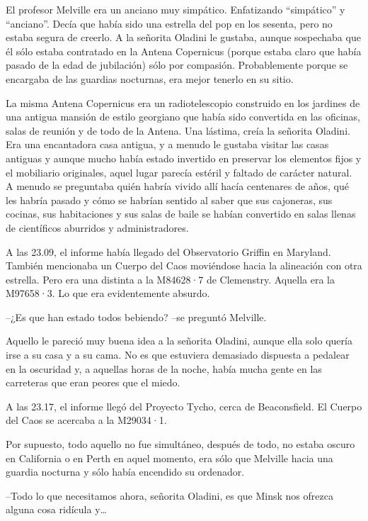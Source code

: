 El profesor Melville era un anciano muy simpático. Enfatizando
``simpático'' y ``anciano''. Decía que había sido una estrella del pop
en los sesenta, pero no estaba segura de creerlo. A la señorita Oladini
le gustaba, aunque sospechaba que él sólo estaba contratado en la Antena
Copernicus (porque estaba claro que había pasado de la edad de
jubilación) sólo por compasión. Probablemente porque se encargaba de las
guardias nocturnas, era mejor tenerlo en su sitio.

La misma Antena Copernicus era un radiotelescopio construido en los
jardines de una antigua mansión de estilo georgiano que había sido
convertida en las oficinas, salas de reunión y de todo de la Antena. Una
lástima, creía la señorita Oladini. Era una encantadora casa antigua, y
a menudo le gustaba visitar las casas antiguas y aunque mucho había
estado invertido en preservar los elementos fijos y el mobiliario
originales, aquel lugar parecía estéril y faltado de carácter natural. A
menudo se preguntaba quién habría vivido allí hacía centenares de años,
qué les habría pasado y cómo se habrían   sentido al saber que sus
cajoneras, sus cocinas, sus habitaciones y sus salas de baile se habían
convertido en salas llenas de científicos aburridos y administradores.

A las 23.09, el informe había llegado del Observatorio Griffin en
Maryland. También mencionaba un Cuerpo del Caos moviéndose hacia la
alineación con otra estrella. Pero era una distinta a la M84628·7 de
Clemenstry. Aquella era la M97658·3. Lo que era evidentemente absurdo.

--¿Es que han estado todos   bebiendo? --se preguntó Melville.

Aquello le pareció muy buena idea a la señorita Oladini, aunque ella
solo quería irse a su casa y a su cama. No es que estuviera demasiado
dispuesta a pedalear en la oscuridad y, a aquellas horas de la noche,
había mucha gente en las carreteras que eran peores que el miedo.

A las 23.17, el informe llegó del Proyecto Tycho, cerca de Beaconsfield.
El Cuerpo del Caos se acercaba a la M29034·1.

Por supuesto, todo aquello no fue simultáneo, después de todo, no estaba
oscuro en California o en Perth en aquel momento, era sólo que Melville
hacia una guardia nocturna y sólo había encendido su ordenador.

--Todo lo que necesitamos ahora, señorita Oladini, es que Minsk nos
ofrezca alguna cosa ridícula y\ldots{}

